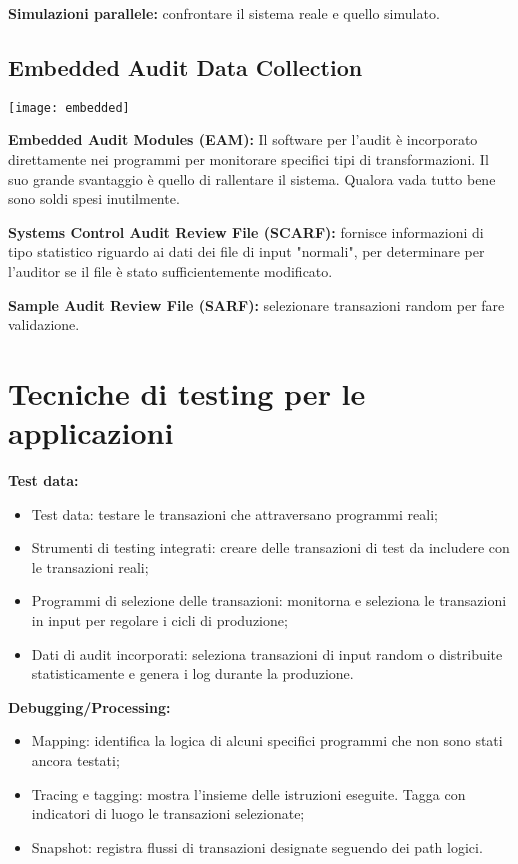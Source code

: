 \textbf{Simulazioni parallele:} confrontare il sistema reale e quello simulato.

\subsection{Embedded Audit Data Collection}

        \begin{center}
                \texttt{[image: embedded]}
        		\label{fig:testing:facilities:parallel}
        \end{center}
        

\textbf{Embedded Audit Modules (EAM):} Il software per l'audit è incorporato 
direttamente nei programmi per monitorare specifici tipi di transformazioni. 
Il suo grande svantaggio è quello di rallentare il sistema. Qualora vada tutto 
bene sono soldi spesi inutilmente.

\textbf{Systems Control Audit Review File (SCARF):} fornisce informazioni di 
tipo statistico riguardo ai dati dei file di input "normali", per determinare 
per l'auditor se il file è stato sufficientemente modificato.

\textbf{Sample Audit Review File (SARF):} selezionare transazioni random per 
fare validazione.

\section{Tecniche di testing per le applicazioni}

\textbf{Test data:}
\begin{itemize}
    \item Test data: testare le transazioni che attraversano programmi reali;
    \item Strumenti di testing integrati: creare delle transazioni di test da 
    includere con le transazioni reali;
    \item Programmi di selezione delle transazioni: monitorna e seleziona le 
    transazioni in input per regolare i cicli di produzione;
    \item Dati di audit incorporati: seleziona transazioni di input random o
    distribuite statisticamente e genera i log durante la produzione.
\end{itemize}

\textbf{Debugging/Processing:}

\begin{itemize}
    \item Mapping: identifica la logica di alcuni specifici programmi che non 
    sono stati ancora testati;
    \item Tracing e tagging: mostra l'insieme delle istruzioni eseguite. Tagga 
    con indicatori di luogo le 
    transazioni selezionate;
    \item Snapshot: registra flussi di transazioni designate seguendo dei path 
    logici.
\end{itemize}

